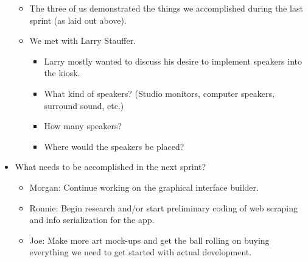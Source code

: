 \documentclass[]{article}
\begin{document}
\begin{itemize}
		\begin{itemize}
			\item The three of us demonstrated the things we accomplished during the last sprint (as laid out above).
			\item We met with Larry Stauffer.
				\begin{itemize}
					\item Larry mostly wanted to discuss his desire to implement speakers into the kiosk. 
					\item What kind of speakers? (Studio monitors, computer speakers, surround sound, etc.)
		  			\item How many speakers?
					\item Where would the speakers be placed?
				\end{itemize}
		\end{itemize}
			 \item What needs to be accomplished in the next sprint?
				 \begin{itemize}
				 	\item Morgan: Continue working on the graphical interface builder.
				 	\item Ronnie: Begin research and/or start preliminary coding of web scraping and info serialization for the app. 
				 	\item Joe: Make more art mock-ups and get the ball rolling on buying everything we need to get started with actual development. 
				 \end{itemize}
	\end{itemize}
\end{document}
